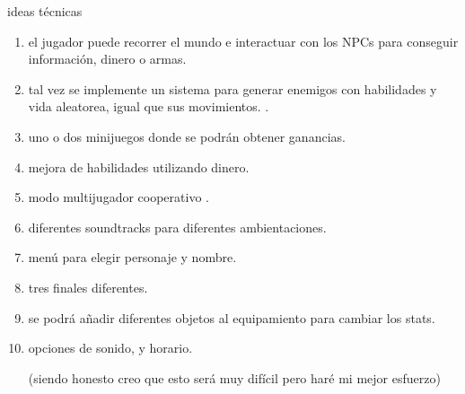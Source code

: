 \documentclass{article}
\begin{document}
{\huge ideas técnicas}

\begin{enumerate}[1.]
    \item el jugador puede recorrer el mundo e interactuar con los NPCs para conseguir información, dinero o armas.
    \item tal vez se implemente un sistema para generar enemigos con habilidades y vida aleatorea, igual que sus movimientos.  .
    \item uno o dos minijuegos donde se podrán obtener ganancias.
    \item mejora de habilidades utilizando dinero.
    \item modo multijugador cooperativo .
    \item diferentes soundtracks para diferentes ambientaciones.
    \item menú para elegir personaje y nombre.
    \item tres finales diferentes.
    \item se podrá añadir diferentes objetos al equipamiento para cambiar los stats.
    \item opciones de sonido, y horario.

   (siendo honesto creo que esto será muy difícil pero haré mi mejor esfuerzo)

\end{enumerate}
\end{document}
